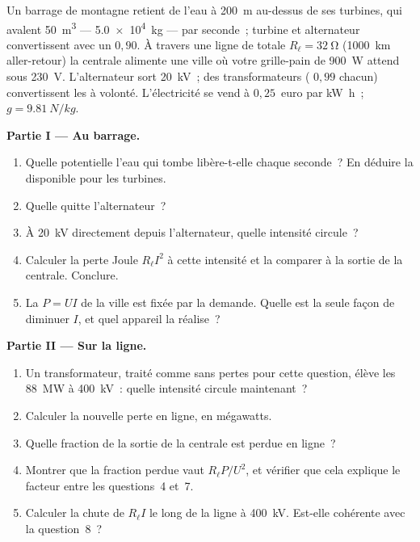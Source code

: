 \begin{problem}
\label{pb:g11:circuits-and-power:1}
Un barrage de montagne retient de l'eau à \qty{200}{m} au-dessus de ses
turbines, qui avalent \qty{50}{m^3} --- \qty{5.0e4}{kg} --- par seconde~;
turbine et alternateur convertissent avec un
 $0{,}90$. À travers une ligne de
 totale $R_\ell = \qty{32}{\ohm}$
(\qty{1000}{km} aller-retour) la centrale alimente une ville où votre
grille-pain de \qty{900}{W} attend sous \qty{230}{V}. L'alternateur
sort \qty{20}{kV}~; des transformateurs
( $0{,}99$ chacun) convertissent
les  à volonté. L'électricité se vend
à $0{,}25$~euro par \unit{kW.h}~; $g = \qty{9.81}{N/kg}$.

\medskip
\noindent\textbf{Partie I --- Au barrage.}
\begin{enumerate}
  \item Quelle  potentielle l'eau qui
        tombe libère-t-elle chaque seconde~? En déduire la
         disponible pour les turbines.
  \item Quelle  quitte
        l'alternateur~?
  \item À \qty{20}{kV} directement depuis l'alternateur, quelle intensité
        circule~?
  \item Calculer la perte Joule $R_\ell I^2$ à cette intensité et la
        comparer à la sortie de la centrale. Conclure.
  \item La  $P = UI$ de la ville est
        fixée par la demande. Quelle est la seule façon de diminuer $I$,
        et quel appareil la réalise~?
\end{enumerate}

\medskip
\noindent\textbf{Partie II --- Sur la ligne.}
\begin{enumerate}[resume]
  \item Un transformateur, traité comme sans pertes pour cette question,
        élève les \qty{88}{MW} à \qty{400}{kV}~: quelle intensité
        circule maintenant~?
  \item Calculer la nouvelle perte en ligne, en mégawatts.
  \item Quelle fraction de la sortie de la centrale est perdue en ligne~?
  \item Montrer que la fraction perdue vaut $R_\ell P/U^2$, et vérifier
        que cela explique le facteur entre les questions~4 et~7.
  \item Calculer la chute de 
        $R_\ell I$ le long de la ligne à \qty{400}{kV}. Est-elle
        cohérente avec la question~8~?
\end{enumerate}


\end{problem}
